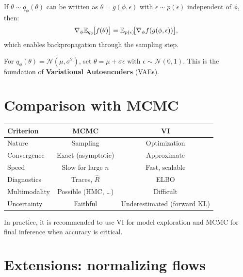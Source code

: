 \begin{definition}
If $\theta \sim q_\phi(\theta)$ can be written as $\theta = g(\phi, \epsilon)$
with $\epsilon \sim p(\epsilon)$ independent of $\phi$, then:
\[
  \nabla_\phi \mathbb{E}_{q_\phi}\!\bigl[f(\theta)\bigr]
  = \mathbb{E}_{p(\epsilon)}\!\bigl[\nabla_\phi f(g(\phi, \epsilon))\bigr],
\]
which enables backpropagation through the sampling step.
\end{definition}

\begin{example}
For $q_\phi(\theta) = \mathcal{N}(\mu, \sigma^2)$, set
$\theta = \mu + \sigma \epsilon$ with $\epsilon \sim \mathcal{N}(0,1)$.
This is the foundation of \textbf{Variational Autoencoders} (VAEs).
\end{example}

\section{Comparison with MCMC}

\begin{center}
\begin{tabular}{lcc}
\hline
\textbf{Criterion} & \textbf{MCMC} & \textbf{VI} \\
\hline
Nature & Sampling & Optimization \\
Convergence & Exact (asymptotic) & Approximate \\
Speed & Slow for large $n$ & Fast, scalable \\
Diagnostics & Traces, $\hat{R}$ & ELBO \\
Multimodality & Possible (HMC, \ldots) & Difficult \\
Uncertainty & Faithful & Underestimated (forward KL) \\
\hline
\end{tabular}
\end{center}

\begin{remark}
In practice, it is recommended to use VI for model exploration and MCMC
for final inference when accuracy is critical.
\end{remark}

\section{Extensions: normalizing flows}

